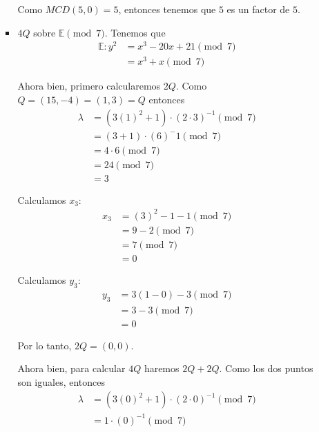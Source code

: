 \documentclass[letterpaper,11pt]{article}
\begin{document}
\begin{enumerate}
\begin{enumerate}
\begin{itemize}
            Como $MCD(5, 0) = 5$, entonces tenemos que $5$ es un factor de $5$.

            \item $4Q$ sobre $\mathbb{E} \pmod{7}$. Tenemos que 
            \begin{align*}
                \mathbb{E} : y^2 
                &= x^3 - 20x + 21 \pmod{7} \\ 
                &= x^3 + x \pmod{7}
            \end{align*}

            Ahora bien, primero calcularemos $2Q$. Como $Q = (15, -4) = (1, 3)
            = Q$ entonces 
            \begin{align*}
                \lambda
                &= (3(1)^2 + 1) \cdot (2 \cdot 3)^{-1} \pmod{7} \\
                &= (3 + 1) \cdot (6)^-1 \pmod{7} \\
                &= 4 \cdot 6 \pmod{7} \\
                &= 24 \pmod{7} \\ 
                &= 3
            \end{align*}

            Calculamos $x_3$:
            \begin{align*}
                x_3
                &= (3)^2 - 1 - 1 \pmod{7} \\ 
                &= 9 - 2 \pmod{7} \\ 
                &= 7 \pmod{7} \\
                &= 0
            \end{align*}

            Calculamos $y_3$:
            \begin{align*}
                y_3
                &= 3(1 - 0) - 3 \pmod{7} \\ 
                &= 3 - 3 \pmod{7} \\ 
                &= 0
            \end{align*}

            Por lo tanto, $2Q = (0, 0)$.

            Ahora bien, para calcular $4Q$ haremos $2Q + 2Q$. Como los dos puntos 
            son iguales, entonces 
            \begin{align*}
                \lambda 
                &= (3(0)^2 + 1) \cdot (2 \cdot 0)^{-1} \pmod{7} \\ 
                &= 1 \cdot (0)^{-1} \pmod{7}
            \end{align*}


\end{itemize}
\end{enumerate}
\end{enumerate}
\end{document}
